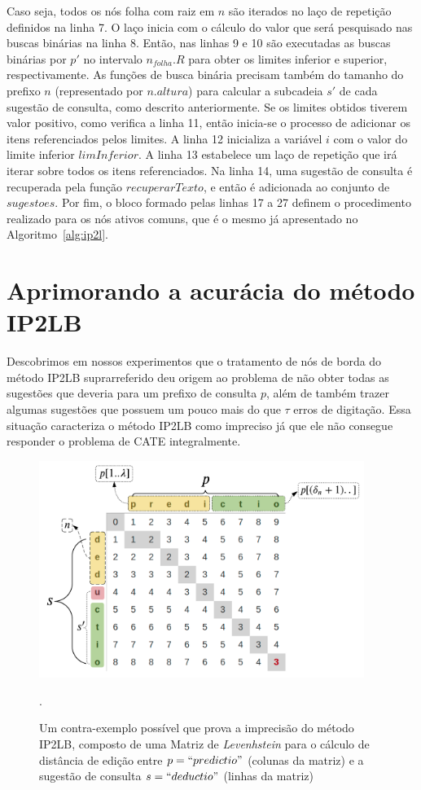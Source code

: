 Caso seja, todos os nós folha com raiz em $n$ são iterados no laço de repetição definidos na linha 7. O laço inicia com o cálculo do valor que será pesquisado nas buscas binárias na linha 8. Então, nas linhas 9 e 10 são executadas as buscas binárias por $p'$ no intervalo $n_{folha}.R$ para obter os limites inferior e superior, respectivamente. As funções de busca binária precisam também do tamanho do prefixo $n$ (representado por $n.altura$) para calcular a subcadeia $s'$ de cada sugestão de consulta, como descrito anteriormente. Se os limites obtidos tiverem valor positivo, como verifica a linha 11, então inicia-se o processo de adicionar os itens referenciados pelos limites. A linha 12 inicializa a variável $i$ com o valor do limite inferior $limInferior$. A linha 13 estabelece um laço de repetição que irá iterar sobre todos os itens referenciados. Na linha 14, uma sugestão de consulta é recuperada pela função $recuperarTexto$, e então é adicionada ao conjunto de $sugestoes$. Por fim, o bloco formado pelas linhas 17 a 27 definem o procedimento realizado para os nós ativos comuns, que é o mesmo já apresentado no Algoritmo~\ref{alg:ip2l}.

\section{Aprimorando a acurácia do método IP2LB}
\label{sec:IP2LRB}

Descobrimos em nossos experimentos que o tratamento de nós de borda do método IP2LB suprarreferido deu origem ao problema de não obter todas as sugestões que deveria para um prefixo de consulta $p$, além de também trazer algumas sugestões que possuem um pouco mais do que $\tau$ erros de digitação. Essa situação caracteriza o método IP2LB como impreciso já que ele não consegue responder o problema de CATE integralmente.

 \begin{figure} [ht]
    \centering
    \includegraphics[width=0.94\textwidth]{figures/binary_search_counterproof.png}
    \caption{Um contra-exemplo possível que prova a imprecisão do método IP2LB, composto de uma Matriz de \textit{Levenhstein} para o cálculo de distância de edição entre $p=``predictio"$ (colunas da matriz) e a sugestão de consulta $s=``deductio"$ (linhas da matriz)}.
    \label{fig:binary_search_counterproof}
\end{figure}

